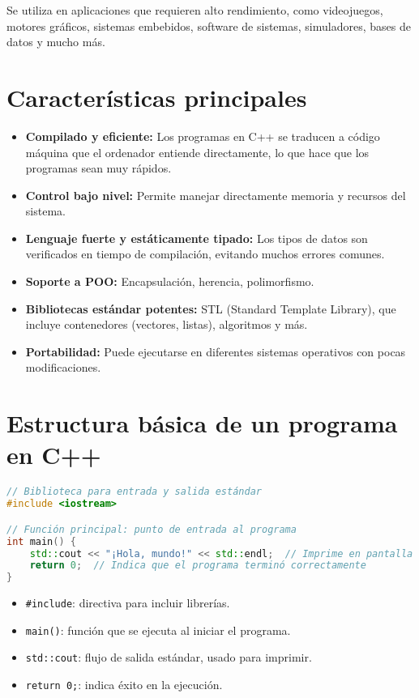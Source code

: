 \documentclass[a4paper]{article}
\begin{document}
Se utiliza en aplicaciones que requieren alto rendimiento, como videojuegos, motores gráficos, sistemas embebidos, software de sistemas, simuladores, bases de datos y mucho más.

\section{Características principales}

\begin{itemize}
    \item \textbf{Compilado y eficiente:} Los programas en C++ se traducen a código máquina que el ordenador entiende directamente, lo que hace que los programas sean muy rápidos.
    \item \textbf{Control bajo nivel:} Permite manejar directamente memoria y recursos del sistema.
    \item \textbf{Lenguaje fuerte y estáticamente tipado:} Los tipos de datos son verificados en tiempo de compilación, evitando muchos errores comunes.
    \item \textbf{Soporte a POO:} Encapsulación, herencia, polimorfismo.
    \item \textbf{Bibliotecas estándar potentes:} STL (Standard Template Library), que incluye contenedores (vectores, listas), algoritmos y más.
    \item \textbf{Portabilidad:} Puede ejecutarse en diferentes sistemas operativos con pocas modificaciones.
\end{itemize}

\section{Estructura básica de un programa en C++}

\begin{lstlisting}[language=C++]
// Biblioteca para entrada y salida estándar
#include <iostream>

// Función principal: punto de entrada al programa
int main() {
    std::cout << "¡Hola, mundo!" << std::endl;  // Imprime en pantalla
    return 0;  // Indica que el programa terminó correctamente
}
\end{lstlisting}

\begin{itemize}
    \item \texttt{\#include}: directiva para incluir librerías.
    \item \texttt{main()}: función que se ejecuta al iniciar el programa.
    \item \texttt{std::cout}: flujo de salida estándar, usado para imprimir.
    \item \texttt{return 0;}: indica éxito en la ejecución.
\end{itemize}
\end{document}
